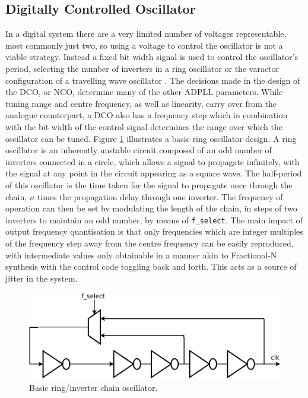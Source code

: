 \subsection{Digitally Controlled Oscillator}
In a digital system there are a very limited number of voltages representable, most commonly just two, so using a voltage to control the oscillator is not a viable strategy. Instead a fixed bit width signal is used to control the oscillator's period, selecting the number of inverters in a ring oscillator or the varactor configuration of a travelling wave oscillator \cite{chen2011rotary}. The decisions made in the design of the \ac{DCO}, or \ac{NCO}, determine many of the other \ac{ADPLL} parameters. While tuning range and centre frequency, as well as linearity, carry over from the analogue counterpart, a \ac{DCO} also has a frequency step which in combination with the bit width of the control signal determines the range over which the oscillator can be tuned. Figure \ref{fig:my_ring} illustrates a basic ring oscillator design. A ring oscillator is an inherently unstable circuit composed of an odd number of inverters connected in a circle, which allows a signal to propagate infinitely, with the signal at any point in the circuit appearing as a square wave. The half-period of this oscillator is the time taken for the signal to propagate once through the chain, $n$ times the propagation delay through one inverter. The frequency of operation can then be set by modulating the length of the chain, in steps of two inverters to maintain an odd number, by means of \texttt{f\_select}. The main impact of output frequency quantisation is that only frequencies which are integer multiples of the frequency step away from the centre frequency can be easily reproduced, with intermediate values only obtainable in a manner akin to Fractional-N synthesis with the control code toggling back and forth. This acts as a source of jitter in the system.
\begin{figure}[h]
	\centering
	\includegraphics[scale=0.275]{../inverter_chain}
	\caption[Basic Ring/Inverter Chain Oscillator]{Basic ring/inverter chain oscillator.}
	\label{fig:my_ring}
\end{figure}

